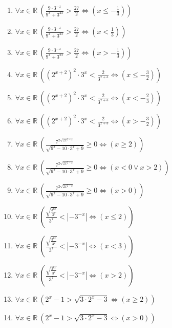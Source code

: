 \documentclass[11pt,a4paper]{article}
\begin{document}
\begin{enumerate}
\item $\displaystyle \forall x \in \mathbb{R}\ \left( \frac{9 \cdot 3^{-x}}{9^{x} + 3^{2x}} > \frac{27}{2} \iff \left( x \le -\frac{1}{3} \right) \right)$
\item $\displaystyle \forall x \in \mathbb{R}\ \left( \frac{9 \cdot 3^{-x}}{9^{x} + 3^{2x}} > \frac{27}{2} \iff \left( x < \frac{1}{3} \right) \right)$
\item $\displaystyle \forall x \in \mathbb{R}\ \left( \frac{9 \cdot 3^{-x}}{9^{x} + 3^{2x}} > \frac{27}{2} \iff \left( x > -\frac{1}{3} \right) \right)$
\item $\displaystyle \forall x \in \mathbb{R}\ \left( (2^{x+2})^{2} \cdot 3^{x} < \frac{2}{3^{x+3}} \iff \left( x \le -\frac{3}{2} \right) \right)$
\item $\displaystyle \forall x \in \mathbb{R}\ \left( (2^{x+2})^{2} \cdot 3^{x} < \frac{2}{3^{x+3}} \iff \left( x < -\frac{2}{3} \right) \right)$
\item $\displaystyle \forall x \in \mathbb{R}\ \left( (2^{x+2})^{2} \cdot 3^{x} < \frac{2}{3^{x+3}} \iff \left( x > -\frac{3}{2} \right) \right)$
\item $\displaystyle \forall x \in \mathbb{R}\ \left( \frac{7^{2\sqrt{2x^{2-x}}}}{\sqrt{9^{x} - 10 \cdot 3^{x} + 9}} \ge 0 \iff \left( x \ge 2 \right) \right)$
\item $\displaystyle \forall x \in \mathbb{R}\ \left( \frac{7^{2\sqrt{2x^{2-x}}}}{\sqrt{9^{x} - 10 \cdot 3^{x} + 9}} \ge 0 \iff \left( x < 0 \lor x > 2 \right) \right)$
\item $\displaystyle \forall x \in \mathbb{R}\ \left( \frac{7^{2\sqrt{2x^{2-x}}}}{\sqrt{9^{x} - 10 \cdot 3^{x} + 9}} \ge 0 \iff \left( x > 0 \right) \right)$
\item $\displaystyle \forall x \in \mathbb{R}\ \left( \frac{\sqrt{\frac{3^{6x}}{3^{2}}}}{3^{7}} < \left| -3^{-x} \right| \iff \left( x \le 2 \right) \right)$
\item $\displaystyle \forall x \in \mathbb{R}\ \left( \frac{\sqrt{\frac{3^{6x}}{3^{2}}}}{3^{7}} < \left| -3^{-x} \right| \iff \left( x < 3 \right) \right)$
\item $\displaystyle \forall x \in \mathbb{R}\ \left( \frac{\sqrt{\frac{3^{6x}}{3^{2}}}}{3^{7}} < \left| -3^{-x} \right| \iff \left( x > 2 \right) \right)$
\item $\displaystyle \forall x \in \mathbb{R}\ \left( 2^{x} - 1 > \sqrt{3 \cdot 2^{x} - 3} \iff \left( x \ge 2 \right) \right)$
\item $\displaystyle \forall x \in \mathbb{R}\ \left( 2^{x} - 1 > \sqrt{3 \cdot 2^{x} - 3} \iff \left( x > 0 \right) \right)$

\end{enumerate}
\end{document}
